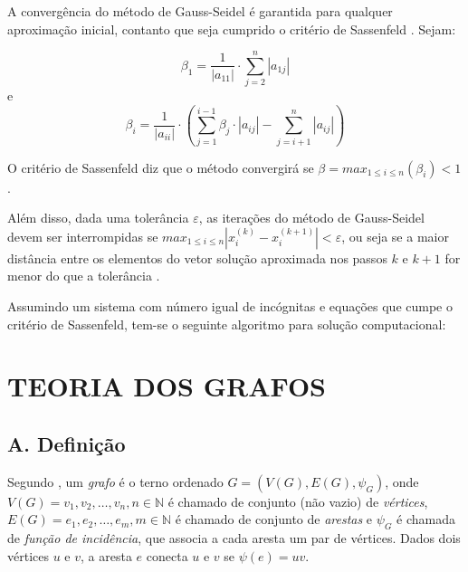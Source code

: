 \documentclass[twocolumn, 10pt]{extarticle}
\begin{document}
A convergência do método de Gauss-Seidel é garantida para qualquer aproximação inicial, contanto que seja cumprido o critério de Sassenfeld \cite[p. 171]{ruggiero}. Sejam:

\[
\beta_1 = \frac{1}{|a_{11}|} \cdot \sum_{j=2}^{n} |a_{1j}|
\]
e
\[
\beta_i = \frac{1}{|a_{ii}|} \cdot \left(\sum_{j=1}^{i-1} \beta_j\cdot |a_{ij}| - \sum_{j=i+1}^{n} |a_{ij}|\right)
\]

O critério de Sassenfeld diz que o método convergirá se $\beta = max_{1 \leq i \leq n} (\beta_i) < 1$ \cite[p. 173]{ruggiero}.

Além disso, dada uma tolerância $\varepsilon$, as iterações do método de Gauss-Seidel devem ser interrompidas se $max_{1 \leq i \leq n} |x^{(k)}_i-x^{(k+1)}_i| < \varepsilon$, ou seja se a maior distância entre os elementos do vetor solução aproximada nos passos $k$ e $k+1$ for menor do que a tolerância \cite[p. 155]{ruggiero}.

Assumindo um sistema com número igual de incógnitas e equações que cumpe o critério de Sassenfeld, tem-se o seguinte algoritmo para solução computacional:

\begingroup
{}\label{gs}
\begin{algorithmic}[1]
			\EndFor
			\EndFor
		\EndFor
		\EndIf
	\EndFor
\EndFunction
\end{algorithmic}
\hrulefill
\endgroup

\section{TEORIA DOS GRAFOS}
\subsection*{A. \quad Definição}

Segundo \cite[p. 1]{bondy}, um \textit{grafo} é o terno ordenado $G = (V(G), E(G), \psi_G)$, onde $V(G) = {v_1, v_2,\dots,v_n}, n \in \mathbb{N}$ é chamado de conjunto (não vazio) de \textit{vértices}, $E(G) = {e_1, e_2,\dots,e_m}, m \in \mathbb{N}$ é chamado de conjunto de \textit{arestas} e $\psi_G$ é chamada de \textit{função de incidência}, que associa a cada aresta um par de vértices. Dados dois vértices $u$ e $v$, a aresta $e$ conecta $u$ e $v$ se $\psi(e) = uv$. 
\end{document}

